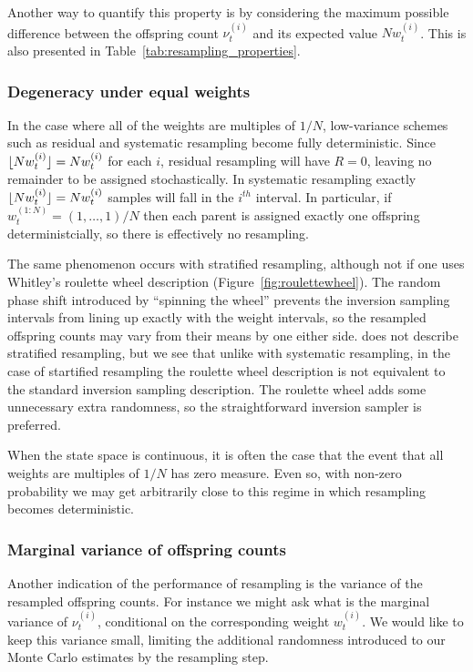 Another way to quantify this property is by considering the maximum possible difference between the offspring count $\nu_t^{(i)}$ and its expected value $N w_t^{(i)}$. This is also presented in Table~\ref{tab:resampling_properties}.




\subsubsection{Degeneracy under equal weights}
In the case where all of the weights are multiples of $1/N$, low-variance schemes such as residual and systematic resampling become fully deterministic. 
Since $\lfloor N w_t^{(i)} \rfloor = Nw_t^{(i)}$ for each $i$, residual resampling will have $R=0$, leaving no remainder to be assigned stochastically. 
In systematic resampling exactly $\lfloor N w_t^{(i)} \rfloor = Nw_t^{(i)}$ samples will fall in the $i^{th}$ interval.
In particular, if $w_t^{(1:N)} = (1,\dots, 1)/N$ then each parent is assigned exactly one offspring deterministcially, so there is effectively no resampling.

The same phenomenon occurs with stratified resampling, although not if one uses Whitley's roulette wheel description (Figure~\ref{fig:roulettewheel}). The random phase shift introduced by ``spinning the wheel'' prevents the inversion sampling intervals from lining up exactly with the weight intervals, so the resampled offspring counts may vary from their means by one either side.
\textcite{whitley1994} does not describe stratified resampling, but we see that unlike with systematic resampling, in the case of startified resampling the roulette wheel description is not equivalent to the standard inversion sampling description. 
The roulette wheel adds some unnecessary extra randomness, so the straightforward inversion sampler is preferred.

When the state space is continuous, it is often the case that the event that all weights are multiples of $1/N$ has zero measure. Even so, with non-zero probability we may get arbitrarily close to this regime in which resampling becomes deterministic.




\subsubsection{Marginal variance of offspring counts}
Another indication of the performance of resampling is the variance of the resampled offspring counts. For instance we might ask what is the marginal variance of $\nu_t^{(i)}$, conditional on the corresponding weight $w_t^{(i)}$. We would like to keep this variance small, limiting the additional randomness introduced to our Monte Carlo estimates by the resampling step.

